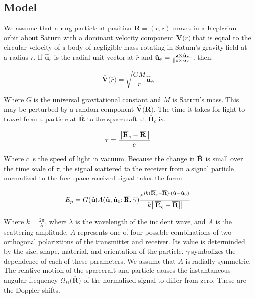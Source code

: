 \documentclass{article}
\theoremstyle{mystyle}
\begin{document}
\subsection{Model}

We assume that a ring particle at position $\overline{\mathbf{R}} = (\overline{r},z)$ moves in a Keplerian orbit about Saturn with a dominant velocity component $\overline{\mathbf{V}}\big(\overline{r}\big)$ that is equal to the circular velocity of a body of negligible mass rotating in Saturn's gravity field at a radius $r$. If $\hat{\mathbf{u}}_{r}$ is the radial unit vector at $\overline{r}$ and $\hat{\mathbf{u}}_{\phi} = \frac{\hat{\mathbf{z}}\times \hat{\mathbf{u}}_{r}}{\norm{\hat{\mathbf{z}}\times \hat{\mathbf{u}}_{r}}}$, then:

\begin{equation}
\overline{\mathbf{V}}\big(\overline{r}\big) = \sqrt{\frac{GM}{r}}\hat{\mathbf{u}}_{\phi}
\end{equation}

Where $G$ is the universal gravitational constant and $M$ is Saturn's mass. This may be perturbed by a random component $\overset{\sim}{\mathbf{V}}\big(\overline{\mathbf{R}}\big)$. The time it takes for light to travel from a particle at $\overline{\mathbf{R}}$ to the spacecraft at $\overline{\mathbf{R}}_{c}$ is:

\begin{equation}
\tau = \frac{\norm{\overline{\mathbf{R}}_{c}-\overline{\mathbf{R}}}}{c}
\end{equation}

\noindent Where $c$ is the speed of light in vacuum. Because the change in $\overline{\mathbf{R}}$ is small over the time scale of $\tau$, the signal scattered to the receiver from a signal particle normalized to the free-space received signal takes the form:

\begin{equation}
E_{p} = G(\hat{\mathbf{u}})A(\hat{\mathbf{u}},\hat{\mathbf{u}}_{0};\overline{\mathbf{R}},\overline{\gamma})\frac{e^{ik(\overline{\mathbf{R}}_{c}-\overline{\mathbf{R}})\cdot (\hat{\mathbf{u}}-\hat{\mathbf{u}}_{0})}}{k\norm{\overline{\mathbf{R}}_{c}-\overline{\mathbf{R}}}}
\end{equation}

\noindent Where $k = \frac{2\pi}{\lambda}$, where $\lambda$ is the wavelength of the incident wave, and $A$ is the scattering amplitude. $A$ represents one of four possible combinations of two orthogonal polariztions of the transmitter and receiver. Its value is determinded by the size, shape, material, and orientation of the particle. $\overline{\gamma}$ symbolizes the dependence of each of these parameters. We assume that $A$ is radially symmetric. The relative motion of the spacecraft and particle causes the instantaneous angular frequency $\Omega_{D}\big(\overline{\mathbf{R}}\big)$ of the normalized signal to differ from zero. These are the Doppler shifts.
\end{document}
